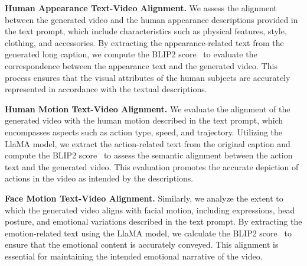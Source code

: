 \noindent\textbf{Human Appearance Text-Video Alignment.}
We assess the alignment between the generated video and the human appearance descriptions provided in the text prompt, which include characteristics such as physical features, style, clothing, and accessories. 
By extracting the appearance-related text from the generated long caption, we compute the BLIP2 score~\cite{li2023blip} to evaluate the correspondence between the appearance text and the generated video. 
This process ensures that the visual attributes of the human subjects are accurately represented in accordance with the textual descriptions.






\noindent\textbf{Human Motion Text-Video Alignment.}
We evaluate the alignment of the generated video with the human motion described in the text prompt, which encompasses aspects such as action type, speed, and trajectory. 
Utilizing the LlaMA model, we extract the action-related text from the original caption and compute the BLIP2 score~\cite{li2023blip} to assess the semantic alignment between the action text and the generated video. 
This evaluation promotes the accurate depiction of actions in the video as intended by the descriptions.

\noindent\textbf{Face Motion Text-Video Alignment.}
Similarly, we analyze the extent to which the generated video aligns with facial motion, including expressions, head posture, and emotional variations described in the text prompt. 
By extracting the emotion-related text using the LlaMA model, we calculate the BLIP2 score~\cite{li2023blip} to ensure that the emotional content is accurately conveyed. 
This alignment is essential for maintaining the intended emotional narrative of the video.